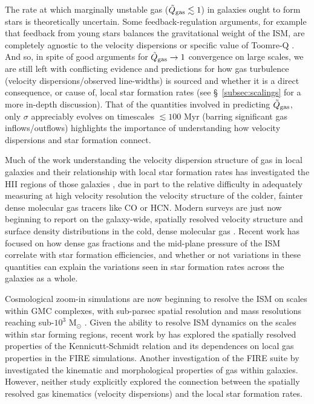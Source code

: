 \documentclass[usletter,fleqn,usenatbib]{mnras}
\begin{document}
The rate at which marginally unstable gas ($\tilde Q_{\rm gas} \lesssim 1$) in galaxies ought to form stars is theoretically uncertain.  Some feedback-regulation arguments, for example that feedback from young stars balances the gravitational weight of the ISM, are completely agnostic to the velocity dispersions or specific value of Toomre-Q \citep{Ostriker2011}.  And so, in spite of good arguments for $\tilde Q_{\rm gas} \rightarrow 1$ convergence on large scales, we are still left with conflicting evidence and predictions for how gas turbulence (velocity dispersions/observed line-widths) is sourced and whether it is a direct consequence, or cause of, local star formation rates (see \S~\ref{subsec:scalings} for a more in-depth discussion).  That of the quantities involved in predicting $\tilde Q_{\rm gas}$, only $\sigma$ appreciably evolves on timescales $\lesssim 100$ Myr (barring significant gas inflows/outflows) highlights the importance of understanding how velocity dispersions and star formation connect.

Much of the work understanding the velocity dispersion structure of gas in local galaxies and their relationship with local star formation rates has investigated the H{\scriptsize II} regions of those galaxies \citep{Larson1981, Gallagher1983, Rozas1998, Rozas2006, Zhou2017}, due in part to the relative difficulty in adequately measuring at high velocity resolution the velocity structure of the colder, fainter dense molecular gas tracers like CO or HCN. Modern surveys are just now beginning to report on the galaxy-wide, spatially resolved velocity structure and surface density distributions in the cold, dense molecular gas \citep{Leroy2017, Gallagher2018,Gallagher2018a, Sun2018, Querejeta2019}.  Recent work has focused on how dense gas fractions and the mid-plane pressure of the ISM correlate with star formation efficiencies, and whether or not variations in these quantities can explain the variations seen in star formation rates across the galaxies as a whole.

Cosmological zoom-in simulations are now beginning to resolve the ISM on scales within GMC complexes, with sub-parsec spatial resolution and mass resolutions reaching sub-$10^3$ M$_\odot$ \citep{Hopkins2014, Wetzel2016, Hopkins2018:fire}.  Given the ability to resolve ISM dynamics on the scales within star forming regions, recent work by \citet{Orr2018} has explored the spatially resolved properties of the Kennicutt-Schmidt relation and its dependences on local gas properties in the FIRE simulations.  Another investigation of the FIRE suite by \citet{El-Badry2018} investigated the kinematic and morphological properties of gas within galaxies.  However, neither study explicitly explored the connection between the spatially resolved gas kinematics (velocity dispersions) and the local star formation rates.
\end{document}
